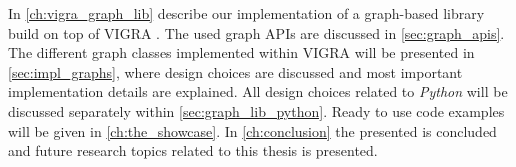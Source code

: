 In \cref{ch:vigra_graph_lib} describe our implementation of
a graph-based library build on top of VIGRA \cite{koethe_2000_phd_thesis,software_vigra}. 
The used graph APIs are discussed in \cref{sec:graph_apis}.
The different graph classes implemented within VIGRA
will be presented in \cref{sec:impl_graphs}, where
design choices are discussed and most 
important implementation details are explained.
All design choices related to \emph{Python} will
be discussed separately within \cref{sec:graph_lib_python}.
Ready to use code examples will be given in \cref{ch:the_showcase}.
In \cref{ch:conclusion} the presented is concluded
and future research topics related to this thesis is presented.




